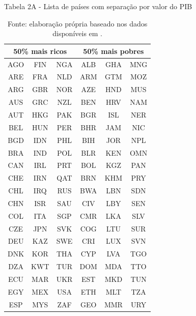 \documentclass[12pt,
               openright,
               oneside,
               a4paper,
							 section=TITLE,     %
               subsection=Title,  %
               english,brazil]{article}
\begin{document}
\begin{table}[H]
\centering

\caption*{Tabela 2A - Lista de países com separação por valor do PIB}
\label{tab:paises}
\begin{tabular}{@{}cccccc@{}}
\multicolumn{3}{c}{50\% mais ricos} & \multicolumn{3}{c}{50\% mais pobres} \\ \midrule
AGO & FIN & NGA & ALB & GHA & MNG \\
ARE & FRA & NLD & ARM & GTM & MOZ \\
ARG & GBR & NOR & AZE & HND & MUS \\
AUS & GRC & NZL & BEN & HRV & NAM \\
AUT & HKG & PAK & BGR & ISL & NER \\
BEL & HUN & PER & BHR & JAM & NIC \\
BGD & IDN & PHL & BIH & JOR & NPL \\
BRA & IND & POL & BLR & KEN & OMN \\
CAN & IRL & PRT & BOL & KGZ & PAN \\
CHE & IRN & QAT & BRN & KHM & PRY \\
CHL & IRQ & RUS & BWA & LBN & SDN \\
CHN & ISR & SAU & CIV & LBY & SEN \\
COL & ITA & SGP & CMR & LKA & SLV \\
CZE & JPN & SVK & COG & LTU & SUR \\
DEU & KAZ & SWE & CRI & LUX & SVN \\
DNK & KOR & THA & CYP & LVA & TGO \\
DZA & KWT & TUR & DOM & MDA & TTO \\
ECU & MAR & UKR & EST & MKD & TUN \\
EGY & MEX & USA & ETH & MLT & TZA \\
ESP & MYS & ZAF & GEO & MMR & URY \\ \bottomrule
\end{tabular}%
\caption*{\RaggedRight  Fonte: elaboração própria baseado nos dados disponíveis em \cite{WorldBank2019}.}
\end{table}
\end{document}

